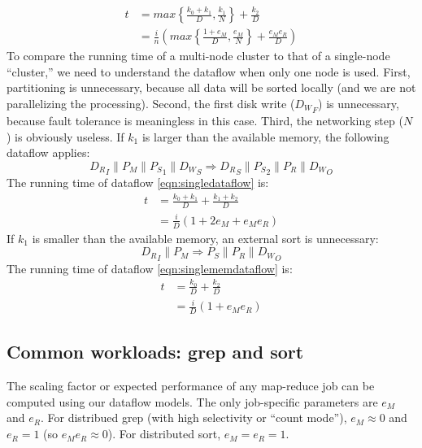\documentclass{acm_proc_article-sp}
\begin{document}
\begin{align}
t &= max\left\{ \frac{k_0 + k_1}{D}, \frac{k_1}{N} \right\} + \frac{k_2}{D}\\
  &= \frac{i}{n} \left( max\left\{ \frac{1 + e_M}{D}, \frac{e_M}{N} \right\} + \frac{e_M e_R}{D} \right)
\label{eqn:memruntime}
\end{align}
To compare the running time of a multi-node cluster to that of a single-node ``cluster,'' we need to understand the dataflow when only one node is used. First, partitioning is unnecessary, because all data will be sorted locally (and we are not parallelizing the processing). Second, the first disk write (${D_W}_F$) is unnecessary, because fault tolerance is meaningless in this case. Third, the networking step ($N$) is obviously useless. If $k_1$ is larger than the available memory, the following dataflow applies:
\begin{equation}
{D_{R}}_I \| P_{M} \| {P_{S}}_1 \|
{D_{W}}_S \Rightarrow {D_{R}}_S \| {P_{S}}_2 \|
P_{R} \| {D_{W}}_O
\label{eqn:singledataflow}
\end{equation}
The running time of dataflow \ref{eqn:singledataflow} is:
\begin{align}
t &= \frac{k_0 + k_1}{D} + \frac{k_1 + k_2}{D}\\
  &= \frac{i}{D} \left( 1 + 2 e_M + e_M e_R \right)
\end{align}
If $k_1$ is smaller than the available memory, an external sort is unnecessary:
\begin{equation}
{D_{R}}_I \| P_{M} \Rightarrow P_{S} \|
P_{R} \| {D_{W}}_O
\label{eqn:singlememdataflow}
\end{equation}
The running time of dataflow \ref{eqn:singlememdataflow} is:
\begin{align}
t &= \frac{k_0}{D} + \frac{k_2}{D}\\
  &= \frac{i}{D} \left( 1 + e_M e_R \right)
\end{align}

\subsection{Common workloads: grep and sort}
The scaling factor or expected performance of any map-reduce job can be computed using our dataflow models. The only job-specific parameters are $e_M$ and $e_R$. For distribued grep (with high selectivity or ``count mode''), $e_M \approx 0$ and $e_R = 1$ (so $e_M e_R \approx 0$). For distributed sort, $e_M = e_R = 1$.
\end{document}
